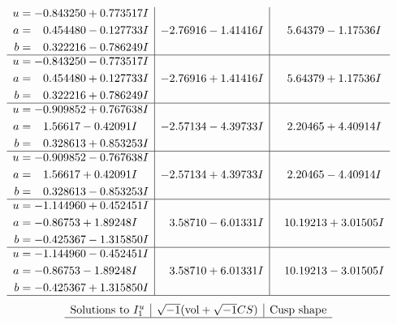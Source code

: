 \documentclass[1p]{elsarticle_modified}
\theoremstyle{definition}
\newcommand{\I}{\sqrt{-1}}
\begin{document}
$$\begin{array}{c|c|c}
\begin{aligned}
u &= -0.843250 + 0.773517 I \\
a &= \phantom{-}0.454480 - 0.127733 I \\
b &= \phantom{-}0.322216 - 0.786249 I\end{aligned}
 & -2.76916 - 1.41416 I & \phantom{-}5.64379 - 1.17536 I \\ \hline\begin{aligned}
u &= -0.843250 - 0.773517 I \\
a &= \phantom{-}0.454480 + 0.127733 I \\
b &= \phantom{-}0.322216 + 0.786249 I\end{aligned}
 & -2.76916 + 1.41416 I & \phantom{-}5.64379 + 1.17536 I \\ \hline\begin{aligned}
u &= -0.909852 + 0.767638 I \\
a &= \phantom{-}1.56617 - 0.42091 I \\
b &= \phantom{-}0.328613 + 0.853253 I\end{aligned}
 & -2.57134 - 4.39733 I & \phantom{-}2.20465 + 4.40914 I \\ \hline\begin{aligned}
u &= -0.909852 - 0.767638 I \\
a &= \phantom{-}1.56617 + 0.42091 I \\
b &= \phantom{-}0.328613 - 0.853253 I\end{aligned}
 & -2.57134 + 4.39733 I & \phantom{-}2.20465 - 4.40914 I \\ \hline\begin{aligned}
u &= -1.144960 + 0.452451 I \\
a &= -0.86753 + 1.89248 I \\
b &= -0.425367 - 1.315850 I\end{aligned}
 & \phantom{-}3.58710 - 6.01331 I & \phantom{-}10.19213 + 3.01505 I \\ \hline\begin{aligned}
u &= -1.144960 - 0.452451 I \\
a &= -0.86753 - 1.89248 I \\
b &= -0.425367 + 1.315850 I\end{aligned}
 & \phantom{-}3.58710 + 6.01331 I & \phantom{-}10.19213 - 3.01505 I\\
 \hline 
 \end{array}$$\newpage$$\begin{array}{c|c|c}  
\text{Solutions to }I^u_{1}& \I (\text{vol} + \sqrt{-1}CS) & \text{Cusp shape}\\
 \hline 

\end{array}$$
\end{document}
